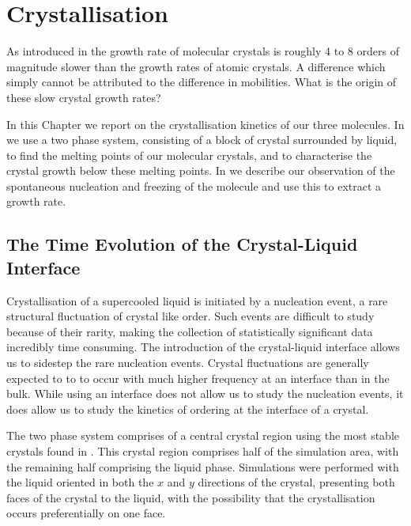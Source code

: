 \chapter{Crystallisation}

As introduced in  the growth rate of molecular crystals is roughly 4 to 8 orders of magnitude slower than the growth rates of atomic crystals. A difference which simply cannot be attributed to the difference in mobilities. What is the origin of these slow crystal growth rates?

In this Chapter we report on the crystallisation kinetics of our three molecules. In  we use a two phase system, consisting of a block of crystal surrounded by liquid, to find the melting points of our molecular crystals, and to characterise the crystal growth below these melting points. In  we describe our observation of the spontaneous nucleation and freezing of the \done molecule and use this to extract a growth rate.

\section{The Time Evolution of the Crystal-Liquid Interface}
\label{sec:two phase}

Crystallisation of a supercooled liquid is initiated by a nucleation event, a rare structural fluctuation of crystal like order. Such events are difficult to study because of their rarity, making the collection of statistically significant data incredibly time consuming. The introduction of the crystal-liquid interface allows us to sidestep the rare nucleation events. Crystal fluctuations are generally expected to to to occur with much higher frequency at an interface than in the bulk. While using an interface does not allow us to study the nucleation events, it does allow us to study the kinetics of ordering at the interface of a crystal.

The two phase system comprises of a central crystal region using the most stable crystals found in . This crystal region comprises half of the simulation area, with the remaining half comprising the liquid phase. Simulations were performed with the liquid oriented in both the $x$ and $y$ directions of the crystal, presenting both faces of the crystal to the liquid, with the possibility that the crystallisation occurs preferentially on one face.

